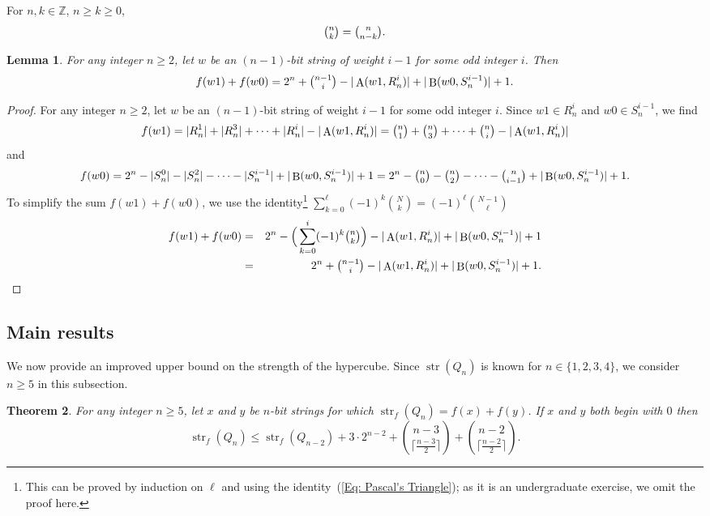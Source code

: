 \documentclass[12pt]{article}
\newtheorem{theorem}{Theorem}[section]
\newtheorem{lemma}[theorem]{Lemma}
\DeclareMathOperator{\str}{str}
\DeclareMathOperator{\Succ}{A}
\DeclareMathOperator{\Prec}{B}
\begin{document}
For $n,k \in \mathbb{Z}$, $n\geq k \geq 0$, 
\begin{equation}\label{Eq: Symmetry}
    \tbinom{n}{k} = \tbinom{n}{n-k}.
\end{equation}

\begin{lemma}\label{obs:x'y'} For any integer $n \geq 2$, let $w$ be an $(n-1)$-bit string of weight $i-1$ for some odd integer $i$.  Then $$f(w1)+f(w0) = 2^n + \tbinom{n-1}{i} - |\Succ(w1,R_n^i)|+|\Prec(w0,S_n^{i-1})|+1.$$\end{lemma}

\begin{proof} For any integer $n \geq 2$, let $w$ be an $(n-1)$-bit string of weight $i-1$ for some odd integer $i$. Since $w1 \in R_n^i$ and $w0 \in S_n^{i-1}$, we find $$f(w1) = |R_n^1|+|R_n^3|+\cdots+|R_n^i| - |\Succ(w1,R_n^i)| = \tbinom{n}{1}+ \tbinom{n}{3}+\cdots+\tbinom{n}{i}-|\Succ(w1,R_n^i)|$$ and $$f(w0) = 2^n - |S_n^0|-|S_n^2|-\cdots - |S_n^{i-1}| +|\Prec(w0,S_n^{i-1})|+1 = 2^n - \tbinom{n}{0}-\tbinom{n}{2}-\cdots-\tbinom{n}{i-1}+|\Prec(w0,S_n^{i-1})|+1.$$
To simplify the sum $f(w1)+f(w0)$, we use the identity\footnote{This can be proved by induction on $\ell$ and using the identity~(\ref{Eq: Pascal's Triangle}); as it is an undergraduate exercise, we omit the proof here.} $\sum_{k=0}^\ell (-1)^k \binom{N}{k} = (-1)^\ell \binom{N-1}{\ell}$ 
\begin{eqnarray*}f(w1)+f(w0) &=& 2^n- \Big( \sum_{k=0}^i (-1)^k \tbinom{n}{k}\Big) - |\Succ(w1,R_n^i)|+|\Prec(w0,S_n^{i-1})|+1 \\ &=& 2^n + \tbinom{n-1}{i} - |\Succ(w1,R_n^i)|+|\Prec(w0,S_n^{i-1})|+1.\end{eqnarray*}  \end{proof} 


\subsection{Main results}\label{ss: Main}

We now provide an improved upper bound on the strength of the hypercube. Since $\str(Q_n)$ is known for $n \in \{1,2,3,4\}$, we consider $n \geq 5$ in this subsection.

\begin{theorem}\label{thm:both0} For any integer $n \geq 5$, let $x$ and $y$ be $n$-bit strings for which $\str_f(Q_{n})=f(x)+f(y)$.  If $x$ and $y$ both begin with $0$ then $$\str_f(Q_{n}) \leq \str_f(Q_{n-2}) + 3 \cdot 2^{n-2} + \binom{n-3}{\lceil \frac{n-3}{2}\rceil}+\binom{n-2}{\lceil \frac{n-2}{2}\rceil}.$$\end{theorem} 
\end{document}
